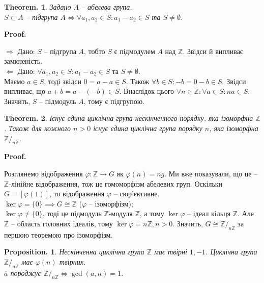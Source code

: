 \documentclass[a4paper, 10pt]{article}
\makeatletter
\def\rightproof{$\boxed{\Rightarrow}$ }
\def\leftproof{$\boxed{\Leftarrow}$ }
\theoremstyle{theoremdd}
\theoremstyle{theoremdd}
\theoremstyle{theoremdd}
\theoremstyle{theoremdd}
\theoremstyle{theoremdd}
\theoremstyle{theoremdd}
\theoremstyle{theoremdd}
\theoremstyle{theoremdd}
\newtheorem*{theorem*}{Theorem.}
\theoremstyle{theoremdd}
\theoremstyle{theoremdd}
\newtheorem*{proposition*}{Proposition.}
\theoremstyle{theoremdd}
\theoremstyle{theoremdd}
\theoremstyle{theoremdd}
\theoremstyle{theoremdd}
\theoremstyle{theoremdd}
\renewenvironment{proof}[1][Proof.\\]{\par
\pushQED{\hfill \qed}%
\normalfont \topsep6\p@\@plus6\p@\relax
\trivlist
\item\relax
{\bfseries
#1\@addpunct{.}}\hspace\labelsep\ignorespaces
}{%
\popQED\endtrivlist\@endpefalse
}
\makeatother
\begin{document}
\begin{theorem*}
Задано $A$ -- абелева група.\\
$S \subset A$ -- підгрупа $A \iff \forall a_1,a_2 \in S: a_1 - a_2 \in S$ та $S \neq \emptyset$.
\end{theorem*}

\begin{proof}
\rightproof Дано: $S$ -- підгрупа $A$, тобто $S$ є підмодулем $A$ над $\mathbb{Z}$. Звідси й випливає замкненість.
\bigskip \\
\leftproof Дано: $\forall a_1,a_2 \in S: a_1 - a_2 \in S$ та $S \neq \emptyset$.\\
Маємо $a \in S$, тоді звідси $0 = a - a \in S$. Також $\forall b \in S: -b = 0-b \in S$. Звідси випливає, що $a+b = a-(-b) \in S$. Внаслідок цього $\forall n \in \mathbb{Z}: \forall a \in S: na \in S$. Значить, $S$ -- підмодуль $A$, тому є підгрупою.
\end{proof}

\begin{theorem*}
Існує єдина циклічна група нескінченного порядку, яка ізоморфна $\mathbb{Z}$. Також для кожного $n > 0$ існує єдина циклічна група порядку $n$, яка ізоморфна $\mathbb{Z}/_{n \mathbb{Z}}$.
\end{theorem*}

\begin{proof}
Розглянемо відображення $\varphi \colon \mathbb{Z} \to G$ як $\varphi(n) = ng$. Ми вже показували, що це -- $\mathbb{Z}$-лінійне відображення, тож це гомоморфізм абелевих груп. Оскільки $G = [\varphi(1)]$, то відображення $\varphi$ -- сюр'єктивне.\\
$\ker \varphi = \{0\} \implies G \cong \mathbb{Z}$ ($\varphi$ -- ізоморфізм);\\
$\ker \varphi \neq \{0\}$, тоді це підмодуль $\mathbb{Z}$-модуля $\mathbb{Z}$, а тому $\ker \varphi$ -- ідеал кільця $\mathbb{Z}$. Але $\mathbb{Z}$ -- область головних ідеалів, тому $\ker \varphi = n \mathbb{Z}, n > 0$. Значить, $G \cong \mathbb{Z}/_{n \mathbb{Z}}$ за першою теоремою про ізоморфізм.
\end{proof}

\begin{proposition*}
Нескінченна циклічна група $\mathbb{Z}$ має твірні $1,-1$. Циклічна група $\mathbb{Z}/_{n \mathbb{Z}}$ має $\varphi(n)$ твірних.\\
$\overline{a}$ породжує $\mathbb{Z}/_{n \mathbb{Z}} \iff \gcd(a,n) = 1$.
\end{proposition*}
\end{document}
